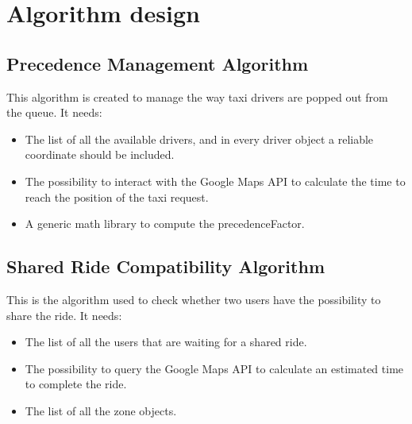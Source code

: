 

\section{Algorithm design} %
\label{sec:algorithm_design}


\subsection{Precedence Management Algorithm} %
\label{sub:first_algorithm}
This algorithm is created to manage the way taxi drivers are popped out from the queue.
It needs:

\begin{itemize}
	\item The list of all the available drivers, and in every driver object a reliable coordinate should be included.
	\item The possibility to interact with the Google Maps API to calculate the time to reach the position of the taxi request.
	\item A generic math library to compute the precedenceFactor.
\end{itemize}







\subsection{Shared Ride Compatibility Algorithm} %
\label{sub:second_algorithm}
This is the algorithm used to check whether two users have the possibility to share the ride.
It needs:
\begin{itemize}
	\item The list of all the users that are waiting for a shared ride.
	\item The possibility to query the Google Maps API to calculate an estimated time to complete the ride.
	\item The list of all the zone objects.
\end{itemize}

